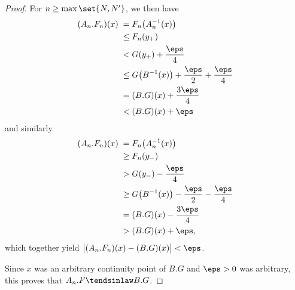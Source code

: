 \begin{proof}
  For $n \ge \max \set{N,N'}$, we then have
  \begin{align*}
    (A_n.F_n)(x) \;
    = \; & F_n \big( A_n^{-1}(x) \big) \\
    \le \; & F_n (y_+) \\
    < \; & G(y_+) + \frac{\eps}{4} \\
    \le \; & G \big( B^{-1}(x) \big) + \frac{\eps}{2} + \frac{\eps}{4} \\
    = \; & (B.G) (x) + \frac{3\eps}{4} \\
    < \; & (B.G) (x) + \eps
  \end{align*}
  and similarly
  \begin{align*}
    (A_n.F_n)(x) \;
    = \; & F_n \big( A_n^{-1}(x) \big) \\
    \ge \; & F_n (y_-) \\
    > \; & G(y_-) - \frac{\eps}{4} \\
    \ge \; & G \big( B^{-1}(x) \big) - \frac{\eps}{2} - \frac{\eps}{4} \\
    = \; & (B.G) (x) - \frac{3\eps}{4} \\
    > \; & (B.G) (x) + \eps ,
  \end{align*}
  which together yield $\big| (A_n.F_n)(x) - (B.G)(x) \big| < \eps$.

  Since $x$ was an arbitrary continuity point of $B.G$ and
  $\eps > 0$ was arbitrary, this proves that $A_n.F \tendsinlaw B.G$.
\end{proof}

